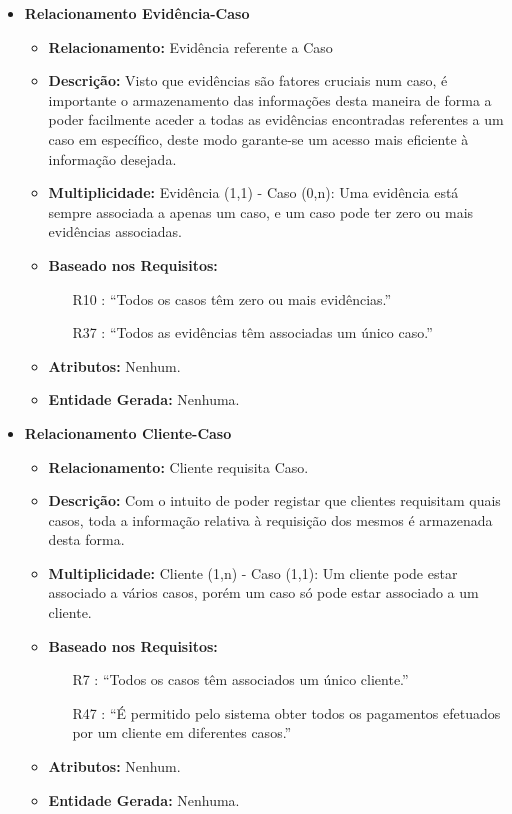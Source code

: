 \documentclass[a4paper,12pt]{scrreprt}
\begin{document}
\begin{itemize}
        \item\textbf{Relacionamento Evidência-Caso}
        \begin{itemize}
            \item\textbf{Relacionamento:} Evidência referente a Caso
            \item\textbf{Descrição:} Visto que evidências são fatores cruciais num caso, é importante o armazenamento das informações desta maneira de forma a poder facilmente aceder a todas as evidências encontradas referentes a um caso em específico, deste modo garante-se um acesso mais eficiente à informação desejada.
            \item\textbf{Multiplicidade:} Evidência (1,1) - Caso (0,n): Uma evidência está sempre associada a apenas um caso, e um caso pode ter zero ou mais evidências associadas.
            \item\textbf{Baseado nos Requisitos:}
            \begin{itemize}
                \item [R10]: “Todos os casos têm zero ou mais evidências.”
                \item [R37]: “Todos as evidências têm associadas um único caso.”
            \end{itemize}
            \item\textbf{Atributos:} Nenhum.
            \item\textbf{Entidade Gerada:} Nenhuma.
        \end{itemize}

        \vspace{0.75cm}

        \item\textbf{Relacionamento Cliente-Caso}
        \begin{itemize}
            \item\textbf{Relacionamento:} Cliente requisita Caso.
            \item\textbf{Descrição:} Com o intuito de poder registar que clientes requisitam quais casos, toda a informação relativa à requisição dos mesmos é armazenada desta forma.
            \item\textbf{Multiplicidade:} Cliente (1,n) - Caso (1,1): Um cliente pode estar associado a vários casos, porém um caso só pode estar associado a um cliente.
            \item\textbf{Baseado nos Requisitos:}
            \begin{itemize}
                \item [R7]: “Todos os casos têm associados um único cliente.”
                \item [R47]: “É permitido pelo sistema obter todos os pagamentos efetuados por um       cliente em diferentes casos.”
            \end{itemize}
            \item\textbf{Atributos:} Nenhum.
            \item\textbf{Entidade Gerada:} Nenhuma.   
        \end{itemize}


\end{itemize}
\end{document}
